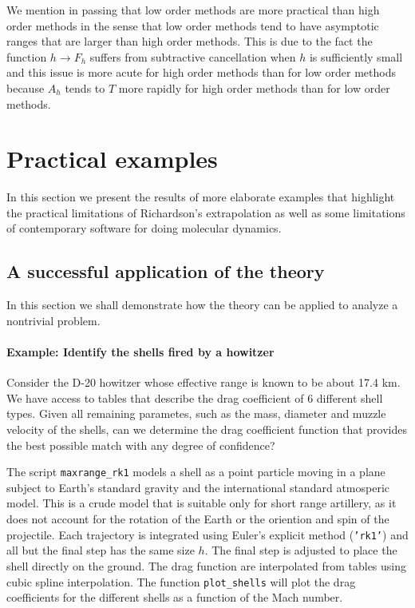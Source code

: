 \documentclass[runningheads]{llncs}
\begin{document}
We mention in passing that low order methods are more practical than high order methods in the sense that low order methods tend to have asymptotic ranges that are larger than high order methods.
This is due to the fact the function $h \rightarrow F_h$ suffers from subtractive cancellation when $h$ is sufficiently small and this issue is more acute for high order methods than for low order methods because $A_h$ tends to $T$ more rapidly for high order methods than for low order methods.


\section{Practical examples}

In this section we present the results of more elaborate examples that highlight the practical limitations of Richardson's extrapolation as well as some limitations of contemporary software for doing molecular dynamics.

\subsection{A successful application of the theory}

In this section we shall demonstrate how the theory can be applied to analyze a nontrivial problem.

\paragraph{Example: Identify the shells fired by a howitzer}

Consider the D-20 howitzer whose effective range is known to be about 17.4 km. We have access to tables that describe the drag coefficient of 6 different shell types. Given all remaining parametes, such as the  mass, diameter and muzzle velocity of the shells, can we determine the drag coefficient function that provides the best possible match with any degree of confidence?

The script {\tt maxrange\_rk1} models a shell as a point particle moving in a plane subject to Earth's standard gravity and the international standard atmosperic model. This is a crude model that is suitable only for short range artillery, as it does not account for the rotation of the Earth or the oriention and spin of the projectile. Each trajectory is integrated using Euler's explicit method ({\tt 'rk1'}) and all but the final step has the same size $h$. The final step is adjusted to place the shell directly on the ground. The drag function are interpolated from tables using cubic spline interpolation. The function {\tt plot\_shells} will plot the drag coefficients for the different shells as a function of the Mach number.
\end{document}
